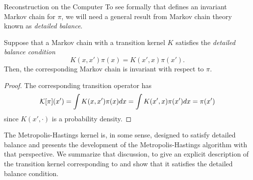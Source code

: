 \begin{chapter}{Reconstruction on the Computer}
To see formally that  defines an invariant Markov chain for $\pi$, we will need a general result from Markov chain theory known as \emph{detailed balance}.
\begin{thm}
  Suppose that a Markov chain with a transition kernel $K$ satisfies the \emph{detailed balance condition} 
  \begin{equation} \label{eq:detailedBalance}
    K(x,x')\pi(x) = K(x',x) \pi(x').
  \end{equation}
  Then, the corresponding Markov chain is invariant with respect to $\pi$.
\end{thm}
\begin{proof}
  The corresponding transition operator has
  \begin{equation}
    \mathcal K[\pi](x') = \int K(x,x') \pi(x)dx = \int K(x',x)\pi(x')dx = \pi(x')
  \end{equation}
  since $K(x',\cdot)$ is a probability density.
\end{proof}
The Metropolis-Hastings kernel is, in some sense, designed to satisfy detailed balance and \citep{calvetti2007introduction} presents the development of the Metropolis-Hastings algorithm with that perspective.
We summarize that discussion, to give an explicit description of the transition kernel corresponding to  and show that it satisfies the detailed balance condition.


\end{chapter}
